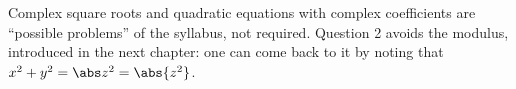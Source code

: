 \begin{teachernote}
Complex square roots and quadratic equations with complex coefficients are ``possible problems'' of the syllabus, not required. Question 2 avoids the modulus, introduced in the next chapter: one can come back to it by noting that $x^2+y^2=\abs z^2=\abs{z^2}$.
\end{teachernote}
